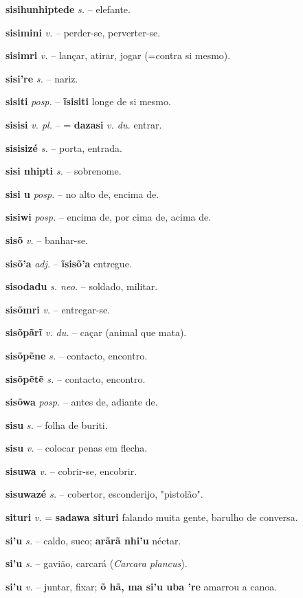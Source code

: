 \textbf{sisihunhiptede} \textit{s.} -- elefante.

\textbf{sisimini} \textit{v.} -- perder-se, perverter-se.

\textbf{sisimri} \textit{v.} -- lançar, atirar, jogar (=contra si mesmo).

\textbf{sisi're} \textit{s.} -- nariz.

\textbf{sisiti} \textit{posp.} -- \textbf{ĩsisiti} longe de si mesmo.

\textbf{sisisi} \textit{v. pl.} -- = \textbf{dazasi} \textit{v. du.} entrar.

\textbf{sisisizé} \textit{s.} -- porta, entrada.

\textbf{sisi nhipti} \textit{s.} -- sobrenome.

\textbf{sisi u} \textit{posp.} -- no alto de, encima de.

\textbf{sisiwi} \textit{posp.} -- encima de, por cima de, acima de.

\textbf{sisõ} \textit{v.} -- banhar-se.

\textbf{sisõ'a} \textit{adj.} -- \textbf{ĩsisõ'a} entregue.

\textbf{sisodadu} \textit{s. neo.} -- soldado, militar.

\textbf{sisõmri} \textit{v.} -- entregar-se.

\textbf{sisõpãrĩ} \textit{v. du.} -- caçar (animal que mata).

\textbf{sisõpẽne} \textit{s.} -- contacto, encontro.

\textbf{sisõpẽtẽ} \textit{s.} -- contacto, encontro.

\textbf{sisõwa} \textit{posp.} -- antes de, adiante de.

\textbf{sisu} \textit{s.} -- folha de buriti.

\textbf{sisu} \textit{v.} -- colocar penas em flecha.

\textbf{sisuwa} \textit{v.} -- cobrir-se, encobrir.

\textbf{sisuwazé} \textit{s.} -- cobertor, esconderijo, "pistolão".

\textbf{situri} \textit{v.} = \textbf{sadawa situri} falando muita gente, barulho de conversa.

\textbf{si'u} \textit{s.} -- caldo, suco; \textbf{arãrã nhi'u} néctar.

\textbf{si'u} \textit{s.} -- gavião, carcará (\textit{Carcara plancus}).

\textbf{si'u} \textit{v.} -- juntar, fixar; \textbf{õ hã, ma si'u uba 're} amarrou a canoa.

